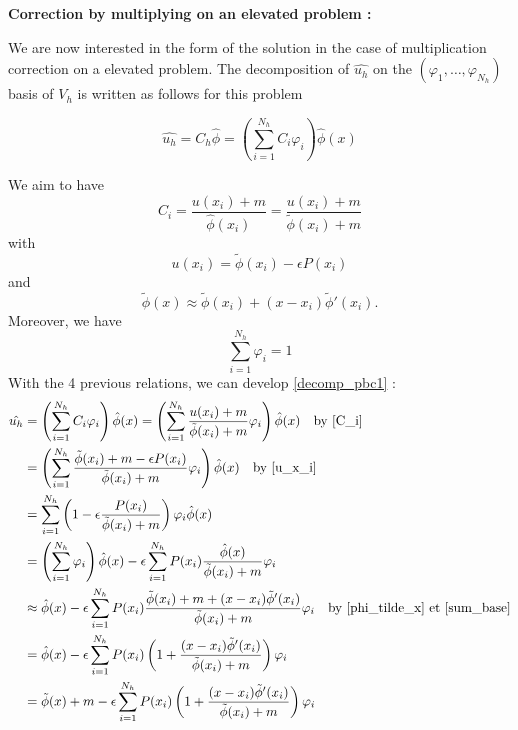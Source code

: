 \textbf{Correction by multiplying on an elevated problem :}

We are now interested in the form of the solution in the case of multiplication correction on a elevated problem. The decomposition of $\hat{u_h}$ on the $(\varphi_1,\dots,\varphi_{N_h})$ basis of $V_h$ is written as follows for this problem

\begin{equation}
	\hat{u_h}=C_h\hat{\phi}=\left(\sum_{i=1}^{N_h}C_i\varphi_i\right)\hat{\phi}(x) \label{decomp_pbc1}
\end{equation}

We aim to have
\begin{equation}
	C_i=\frac{u(x_i)+m}{\hat{\phi}(x_i)}=\frac{u(x_i)+m}{\tilde{\phi}(x_i)+m} \label{C_i}
\end{equation}
with
\begin{equation}
	u(x_i)=\tilde{\phi}(x_i)-\epsilon P(x_i) \label{u_x_i}
\end{equation}
and
\begin{equation}
	\tilde{\phi}(x)\approx\tilde{\phi}(x_i)+(x-x_i)\tilde{\phi}'(x_i). \label{phi_tilde_x}
\end{equation}
Moreover, we have 
\begin{equation}
	\sum_{i=1}^{N_h}\varphi_i=1 \label{sum_base}
\end{equation}
With the 4 previous relations, we can develop \ref{decomp_pbc1} :
\begin{align*}
	\hat{u_h}&=\left(\sum_{i=1}^{N_h}C_i\varphi_i\right)\hat{\phi}(x)=\left(\sum_{i=1}^{N_h}\frac{u(x_i)+m}{\tilde{\phi}(x_i)+m}\varphi_i\right)\hat{\phi}(x) \quad \text{by \ref{C_i}} \\
	&=\left(\sum_{i=1}^{N_h}\frac{\tilde{\phi}(x_i)+m-\epsilon P(x_i)}{\tilde{\phi}(x_i)+m}\varphi_i\right)\hat{\phi}(x) \quad \text{by \ref{u_x_i}} \\
	&=\sum_{i=1}^{N_h}\left(1-\epsilon\frac{ P(x_i)}{\tilde{\phi}(x_i)+m}\right)\varphi_i\hat{\phi}(x) \\
	&=\left(\sum_{i=1}^{N_h}\varphi_i\right)\hat{\phi}(x)-\epsilon\sum_{i=1}^{N_h}P(x_i)\frac{\hat{\phi}(x)}{\tilde{\phi}(x_i)+m}\varphi_i \\
	&\approx\hat{\phi}(x)-\epsilon\sum_{i=1}^{N_h}P(x_i)\frac{\tilde{\phi}(x_i)+m+(x-x_i)\tilde{\phi}'(x_i)}{\tilde{\phi}(x_i)+m}\varphi_i \quad \text{by \ref{phi_tilde_x} et \ref{sum_base}} \\
	&=\hat{\phi}(x)-\epsilon\sum_{i=1}^{N_h}P(x_i)\left(1+\frac{(x-x_i)\tilde{\phi}'(x_i)}{\tilde{\phi}(x_i)+m}\right)\varphi_i \\
	&=\tilde{\phi}(x)+m-\epsilon\sum_{i=1}^{N_h}P(x_i)\left(1+\frac{(x-x_i)\tilde{\phi}'(x_i)}{\tilde{\phi}(x_i)+m}\right)\varphi_i \\
\end{align*}

